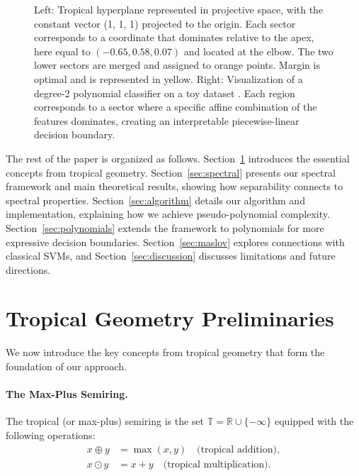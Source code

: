 \documentclass{article}
\newcommand{\R}{\mathbb{R}}
\newcommand{\trop}{\mathbb{T}}
\begin{document}
\begin{figure}[h]
    \centering
    \begin{subfigure}[b]{0.35\textwidth}
        \centering
        \resizebox{\textwidth}{!}{\clipbox{0.1\width{} 0.1\height{} 0.1\width{} 0.1\height{}}{}}
    \end{subfigure}
    \hfill
    \begin{subfigure}[b]{0.61\textwidth}
        \centering
        \resizebox{\textwidth}{!}{\clipbox{0.15\width{} 0.30\height{} 0.15\width{} 0.30\height{}}{}}
    \end{subfigure}
    \caption{Left: Tropical hyperplane represented in projective space, with the constant vector (1, 1, 1) projected to the origin. Each sector corresponds to a coordinate that dominates relative to the apex, here equal to $(-0.65, 0.58, 0.07)$ and located at the elbow. The two lower sectors are merged and assigned to orange points. Margin is optimal and is represented in yellow. Right: Visualization of a degree-2 polynomial classifier on a toy dataset \cite{scikit-learn}. Each region corresponds to a sector where a specific affine combination of the features dominates, creating an interpretable piecewise-linear decision boundary.}
    \label{fig:tropical_poly}
\end{figure}
The rest of the paper is organized as follows. Section~\ref{sec:prelim} introduces the essential concepts from tropical geometry. Section~\ref{sec:spectral} presents our spectral framework and main theoretical results, showing how separability connects to spectral properties. Section~\ref{sec:algorithm} details our algorithm and implementation, explaining how we achieve pseudo-polynomial complexity. Section~\ref{sec:polynomials} extends the framework to polynomials for more expressive decision boundaries. Section~\ref{sec:maslov} explores connections with classical SVMs, and Section~\ref{sec:discussion} discusses limitations and future directions.

\section{Tropical Geometry Preliminaries}\label{sec:prelim}

We now introduce the key concepts from tropical geometry that form the foundation of our approach.

\paragraph{The Max-Plus Semiring.}
The tropical (or max-plus) semiring is the set $\trop = \R \cup \{-\infty\}$
equipped with the following operations:
\begin{align}
x \oplus y &= \max(x,y) \quad \text{(tropical addition)}, \\
x \odot y &= x + y \quad \text{(tropical multiplication)}.
\end{align}
\end{document}
